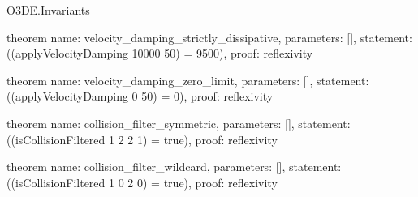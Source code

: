 \begin{lexlean}{O3DE.Invariants}
\begin{semanticmodule}
theorem{
  name: velocity_damping_strictly_dissipative,
  parameters: [],
  statement: ((applyVelocityDamping 10000 50) = 9500),
  proof: reflexivity{}
}

theorem{
  name: velocity_damping_zero_limit,
  parameters: [],
  statement: ((applyVelocityDamping 0 50) = 0),
  proof: reflexivity{}
}

theorem{
  name: collision_filter_symmetric,
  parameters: [],
  statement: ((isCollisionFiltered 1 2 2 1) = true),
  proof: reflexivity{}
}

theorem{
  name: collision_filter_wildcard,
  parameters: [],
  statement: ((isCollisionFiltered 1 0 2 0) = true),
  proof: reflexivity{}
}
\end{semanticmodule}
\end{lexlean}
